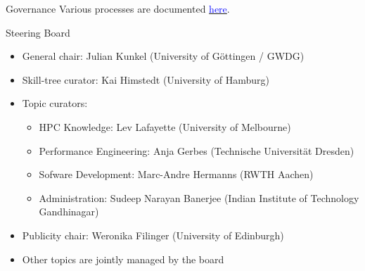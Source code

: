 \documentclass[compress,aspectratio=169]{beamer}
\newcommand{\hrefb}[2]{\href{#1}{\textcolor{blue}{#2}}}
\begin{document}
\begin{frame}{Governance}
	\smallskip
  Various processes are documented \hrefb{https://www.hpc-certification.org/processes/}{here}.
  \begin{block}{Steering Board}
  \vspace*{-0.5em}
  \begin{itemize}
    \item General chair: Julian Kunkel (University of Göttingen / GWDG)
    \item Skill-tree curator: Kai Himstedt (University of Hamburg)
    \item Topic curators:
    \begin{itemize}
      \item HPC Knowledge: Lev Lafayette (University of Melbourne)
      \item Performance Engineering: Anja Gerbes (Technische Universität Dresden)
      \item Sofware Development: Marc-Andre Hermanns (RWTH Aachen)
      \item Administration: Sudeep Narayan Banerjee (Indian Institute of Technology Gandhinagar)
    \end{itemize}    
    \item Publicity chair: Weronika Filinger (University of Edinburgh)
    \item Other topics are jointly managed by the board
  \end{itemize}
  \end{block}
\end{frame}
\end{document}
